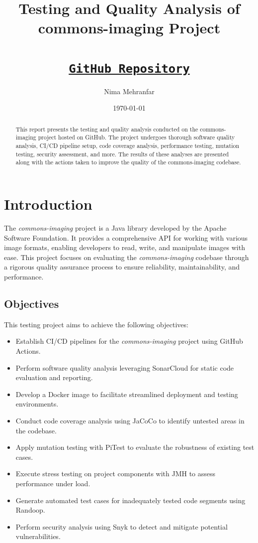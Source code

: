 \documentclass[a4paper,12pt]{report}
\title{Testing and Quality Analysis of\\commons-imaging Project\\ \\
\vspace{0.5cm}\href{https://github.com/nimamehranfar/commons-imaging}{\texttt{GitHub Repository}}\\}
\author{Nima Mehranfar}
\date{\today}
\begin{document}
\maketitle

\begin{abstract}
    This report presents the testing and quality analysis conducted on the commons-imaging project hosted on GitHub. The project undergoes thorough software quality analysis, CI/CD pipeline setup, code coverage analysis, performance testing, mutation testing, security assessment, and more. The results of these analyses are presented along with the actions taken to improve the quality of the commons-imaging codebase.
\end{abstract}

\tableofcontents
\newpage

\listoffigures
\newpage

\listoftables
\newpage

\chapter{Introduction}
The \textit{commons-imaging} project is a Java library developed by the Apache Software Foundation. It provides a comprehensive API for working with various image formats, enabling developers to read, write, and manipulate images with ease. This project focuses on evaluating the \textit{commons-imaging} codebase through a rigorous quality assurance process to ensure reliability, maintainability, and performance.

\section{Objectives}
This testing project aims to achieve the following objectives:
\begin{itemize}
    \item Establish CI/CD pipelines for the \textit{commons-imaging} project using GitHub Actions.
    \item Perform software quality analysis leveraging SonarCloud for static code evaluation and reporting.
    \item Develop a Docker image to facilitate streamlined deployment and testing environments.
    \item Conduct code coverage analysis using JaCoCo to identify untested areas in the codebase.
    \item Apply mutation testing with PiTest to evaluate the robustness of existing test cases.
    \item Execute stress testing on project components with JMH to assess performance under load.
    \item Generate automated test cases for inadequately tested code segments using Randoop.
    \item Perform security analysis using Snyk to detect and mitigate potential vulnerabilities.
\end{itemize}
\end{document}
